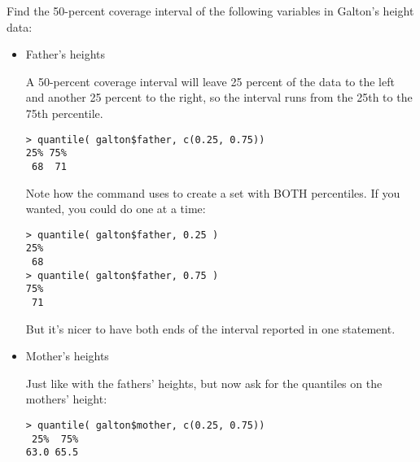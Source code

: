 \bigskip
\noindent 
Find the 50-percent coverage interval of the following variables in Galton's height data:
\begin{itemize}
\item Father's heights
\begin{MultipleChoice}
\end{MultipleChoice}

\begin{AnswerText}
A 50-percent coverage interval will leave 25 percent of the data to
the left and another 25 percent to the right, so the interval runs
from the 25th to the 75th percentile.
\begin{verbatim}
> quantile( galton$father, c(0.25, 0.75))
25% 75% 
 68  71 
\end{verbatim}
Note how the command uses  to create a set with
BOTH percentiles.  If you wanted, you could do one at a time:
\begin{verbatim}
> quantile( galton$father, 0.25 )
25% 
 68 
> quantile( galton$father, 0.75 )
75% 
 71 
\end{verbatim}
But it's nicer to have both ends of the interval reported in one statement.
\end{AnswerText}

\item Mother's heights
\begin{MultipleChoice}
\end{MultipleChoice}

\begin{AnswerText}
Just like with the fathers' heights, but now ask for the quantiles on
the mothers' height:
\begin{verbatim}
> quantile( galton$mother, c(0.25, 0.75))
 25%  75% 
63.0 65.5
\end{verbatim}
\end{AnswerText}

\end{itemize}


